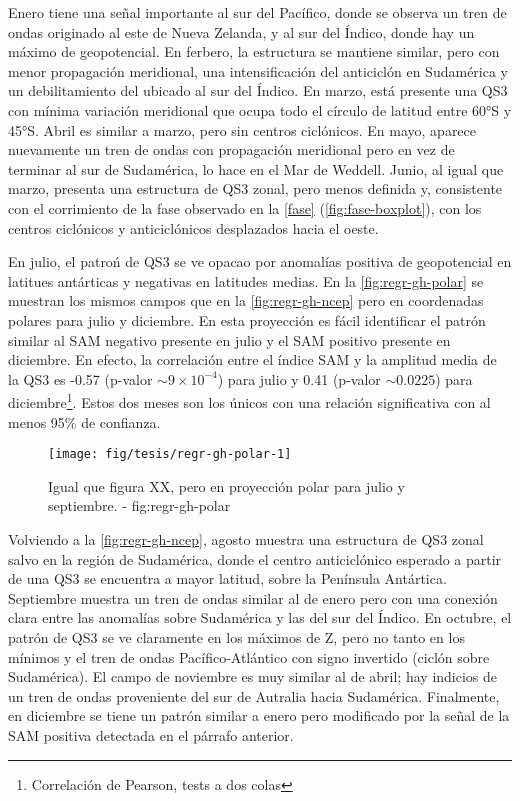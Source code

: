 \documentclass[spanish,a4paper,12p]{book}
\let\rmarkdownfootnote\footnote%
\def\footnote{\protect\rmarkdownfootnote}
\begin{document}
Enero tiene una señal importante al sur del Pacífico, donde se observa
un tren de ondas originado al este de Nueva Zelanda, y al sur del
Índico, donde hay un máximo de geopotencial. En ferbero, la estructura
se mantiene similar, pero con menor propagación meridional, una
intensificación del anticiclón en Sudamérica y un debilitamiento del
ubicado al sur del Índico. En marzo, está presente una QS3 con mínima
variación meridional que ocupa todo el círculo de latitud entre 60°S y
45°S. Abril es similar a marzo, pero sin centros ciclónicos. En mayo,
aparece nuevamente un tren de ondas con propagación meridional pero en
vez de terminar al sur de Sudamérica, lo hace en el Mar de Weddell.
Junio, al igual que marzo, presenta una estructura de QS3 zonal, pero
menos definida y, consistente con el corrimiento de la fase observado en
la \autoref{fase} (\autoref{fig:fase-boxplot}), con los centros
ciclónicos y anticiclónicos desplazados hacia el oeste.

En julio, el patroń de QS3 se ve opacao por anomalías positiva de
geopotencial en latitues antárticas y negativas en latitudes medias. En
la \autoref{fig:regr-gh-polar} se muestran los mismos campos que en la
\autoref{fig:regr-gh-ncep} pero en coordenadas polares para julio y
diciembre. En esta proyección es fácil identificar el patrón similar al
SAM negativo presente en julio y el SAM positivo
presente en diciembre. En efecto, la correlación entre el índice SAM y
la amplitud media de la QS3 es -0.57 (p-valor \(\sim 9\times 10^{-4}\))
para julio y 0.41 (p-valor \(\sim 0.0225\)) para
diciembre\footnote{Correlación de Pearson, tests a dos colas}. Estos dos
meses son los únicos con una relación significativa con al menos 95\% de
confianza.

\begin{figure*}
\texttt{[image: fig/tesis/regr-gh-polar-1]} \caption{Igual que figura  XX, pero en proyección polar para julio y septiembre. - fig:regr-gh-polar}\label{fig:regr-gh-polar}
\end{figure*}

Volviendo a la \autoref{fig:regr-gh-ncep}, agosto muestra una estructura
de QS3 zonal salvo en la región de Sudamérica, donde el centro
anticiclónico esperado a partir de una QS3 se encuentra a mayor latitud,
sobre la Península Antártica. Septiembre muestra un tren de ondas
similar al de enero pero con una conexión clara entre las anomalías
sobre Sudamérica y las del sur del Índico. En
octubre, el patrón de QS3 se ve claramente en los máximos de Z, pero no
tanto en los mínimos y el tren de ondas Pacífico-Atlántico con signo
invertido (ciclón sobre Sudamérica). El campo de noviembre es muy
similar al de abril; hay indicios de un tren de ondas proveniente del
sur de Autralia hacia Sudamérica. Finalmente, en diciembre se tiene un
patrón similar a enero pero modificado por la señal de la SAM positiva
detectada en el párrafo anterior.
\end{document}

